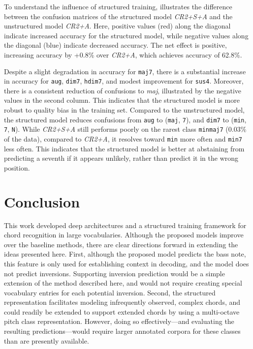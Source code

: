 \documentclass{article}
\begin{document}
To understand the influence of structured training,  illustrates the difference between the confusion matrices of the structured model \emph{CR2+S+A} and the unstructured model \emph{CR2+A}.
Here, positive values (red) along the diagonal indicate increased accuracy for the structured model, while negative values along the diagonal (blue) indicate decreased accuracy.
The net effect is positive, increasing accuracy by +0.8\% over \emph{CR2+A}, which achieves accuracy of 62.8\%.

Despite a slight degradation in accuracy for \texttt{maj7}, there is a substantial increase in accuracy for \texttt{aug}, \texttt{dim7}, \texttt{hdim7}, and modest improvement for \texttt{sus4}.
Moreover, there is a consistent reduction of confusions to \emph{maj}, illustrated by the negative values in the second column.
This indicates that the structured model is more robust to quality bias in the training set.
Compared to the unstructured model, the structured model reduces confusions from \texttt{aug} to (\texttt{maj}, \texttt{7}), and \texttt{dim7} to (\texttt{min}, \texttt{7}, \texttt{N}).
While \emph{CR2+S+A} still performs poorly on the rarest class \texttt{minmaj7} (0.03\% of the data), compared to \emph{CR2+A}, it resolves toward \texttt{min} more often and \texttt{min7} less often.
This indicates that the structured model is better at abstaining from predicting a seventh if it appears unlikely, rather than predict it in the wrong position.


\section{Conclusion}
This work developed deep architectures and a structured training framework for chord recognition in large vocabularies.
Although the proposed models improve over the baseline methods, there are clear directions forward in extending the ideas presented here.
First, although the proposed model predicts the bass note, this feature is only used for establishing context in decoding, and the model does not predict inversions.
Supporting inversion prediction would be a simple extension of the method described here, and would not require creating special vocabulary entries for each potential inversion.
Second, the structured representation facilitates modeling infrequently observed, complex chords, and could readily be extended to support extended chords by using a multi-octave pitch class representation.
However, doing so effectively---and evaluating the resulting predictions---would require larger annotated corpora for these classes than are presently available.

%       




\end{document}
